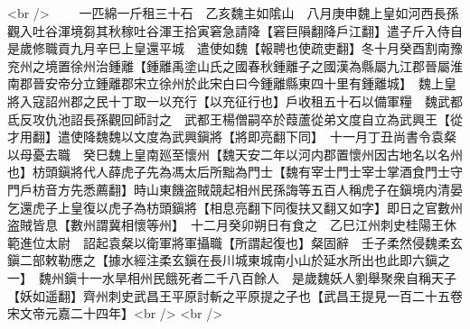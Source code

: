 <br />
　　一匹綿一斤租三十石　乙亥魏主如隂山　八月庚申魏上皇如河西長孫觀入吐谷渾境芻其秋稼吐谷渾王拾寅窘急請降【窘巨隕翻降戶江翻】遣子斤入侍自是歲修職貢九月辛巳上皇還平城　遣使如魏【報聘也使疏吏翻】冬十月癸酉割南豫兖州之境置徐州治鍾離【鍾離禹塗山氏之國春秋鍾離子之國漢為縣屬九江郡晉屬淮南郡晉安帝分立鍾離郡宋立徐州於此宋白曰今鍾離縣東四十里有鍾離城】　魏上皇將入寇詔州郡之民十丁取一以充行【以充征行也】戶收租五十石以備軍糧　魏武都氐反攻仇池詔長孫觀回師討之　武都王楊僧嗣卒於葭蘆從弟文度自立為武興王【從才用翻】遣使降魏魏以文度為武興鎭將【將即亮翻下同】　十一月丁丑尚書令袁粲以母憂去職　癸巳魏上皇南廵至懷州【魏天安二年以河内郡置懷州因古地名以名州也】枋頭鎭將代人薛虎子先為馮太后所黜為門士【魏有宰士門士宰士掌酒食門士守門戶枋音方先悉薦翻】時山東饑盗賊競起相州民孫誨等五百人稱虎子在鎭境内清晏乞還虎子上皇復以虎子為枋頭鎭將【相息亮翻下同復扶又翻又如字】即日之官數州盗賊皆息【數州謂冀相懷等州】　十二月癸卯朔日有食之　乙巳江州刺史桂陽王休範進位太尉　詔起袁粲以衛軍將軍攝職【所謂起復也】粲固辭　壬子柔然侵魏柔玄鎭二部敕勒應之【據水經注柔玄鎭在長川城東城南小山於延水所出也此即六鎭之一】　魏州鎭十一水旱相州民餓死者二千八百餘人　是歲魏妖人劉舉聚衆自稱天子【妖如遥翻】齊州刺史武昌王平原討斬之平原提之子也【武昌王提見一百二十五卷宋文帝元嘉二十四年】<br />
<br />
